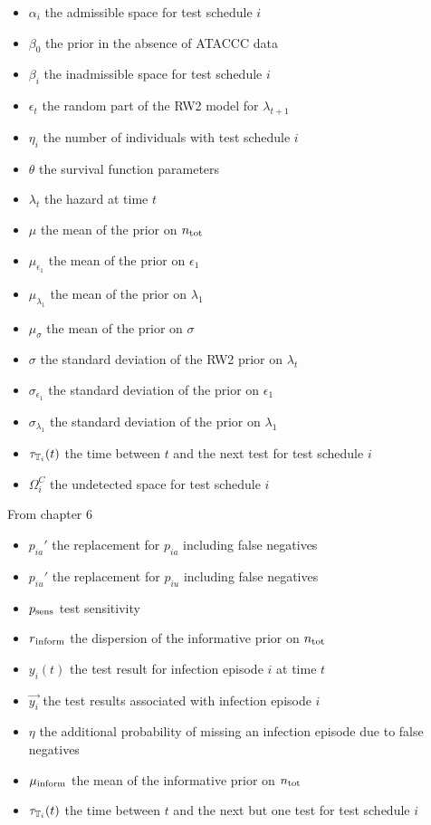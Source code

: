 \documentclass[thesis.tex]{subfiles}
\begin{document}
\begin{itemize}
    \item $\alpha_i$ the admissible space for test schedule $i$
    \item $\beta_0$ the prior in the absence of ATACCC data
    \item $\beta_i$ the inadmissible space for test schedule $i$
    \item $\epsilon_t$ the random part of the RW2 model for $\lambda_{t+1}$
    \item $\eta_i$ the number of individuals with test schedule $i$
    \item $\theta$ the survival function parameters
    \item $\lambda_t$ the hazard at time $t$
    \item $\mu$ the mean of the prior on $n_\text{tot}$
    \item $\mu_{\epsilon_1}$ the mean of the prior on $\epsilon_1$
    \item $\mu_{\lambda_1}$ the mean of the prior on $\lambda_1$
    \item $\mu_\sigma$ the mean of the prior on $\sigma$
    \item $\sigma$ the standard deviation of the RW2 prior on $\lambda_t$
    \item $\sigma_{\epsilon_1}$ the standard deviation of the prior on $\epsilon_1$
    \item $\sigma_{\lambda_1}$ the standard deviation of the prior on $\lambda_1$
    \item $\tau_{\mathbb{T}_i}(t)$ the time between $t$ and the next test for test schedule $i$
    \item $\Omega_i^C$ the undetected space for test schedule $i$
\end{itemize}

From chapter 6
\begin{itemize}
    \item $p_{ia}'$ the replacement for $p_{ia}$ including false negatives
    \item $p_{iu}'$ the replacement for $p_{iu}$ including false negatives
    \item $p_\text{sens}$ test sensitivity
    \item $r{_{\text{inform}}}$ the dispersion of the informative prior on $n_\text{tot}$
    \item $y_i(t)$ the test result for infection episode $i$ at time $t$
    \item $\vec{y_i}$ the test results associated with infection episode $i$
    \item $\eta$ the additional probability of missing an infection episode due to false negatives
    \item $\mu{_{\text{inform}}}$ the mean of the informative prior on $n_\text{tot}$
    \item $\tau_{\mathbb{T}_i}(t)$ the time between $t$ and the next but one test for test schedule $i$
\end{itemize}
\end{document}
